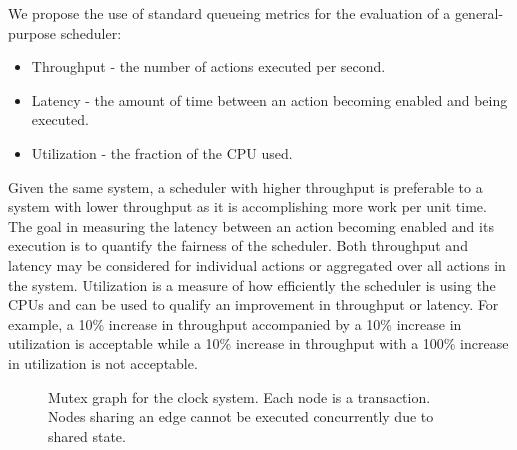 We propose the use of standard queueing metrics for the evaluation of a general-purpose scheduler:
\begin{itemize}
\item Throughput - the number of actions executed per second.
\item Latency - the amount of time between an action becoming enabled and being executed.
\item Utilization - the fraction of the CPU used.
\end{itemize}
Given the same system, a scheduler with higher throughput is preferable to a system with lower throughput as it is accomplishing more work per unit time.
The goal in measuring the latency between an action becoming enabled and its execution is to quantify the fairness of the scheduler.
Both throughput and latency may be considered for individual actions or aggregated over all actions in the system.
Utilization is a measure of how efficiently the scheduler is using the CPUs and can be used to qualify an improvement in throughput or latency.
For example, a 10\% increase in throughput accompanied by a 10\% increase in utilization is acceptable while a 10\% increase in throughput with a 100\% increase in utilization is not acceptable.

\begin{figure}
\centering
{}%
\caption{Mutex graph for the clock system.  Each node is a transaction.  Nodes sharing an edge cannot be executed concurrently due to shared state. \label{clock_system_mutex}}
\end{figure}

